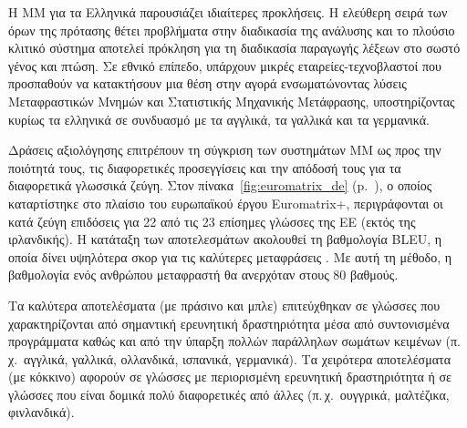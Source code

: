 \documentclass[]{../../metanetpaper}
\begin{document}
\begin{multicols}{2}

Η ΜΜ για τα Ελληνικά παρουσιάζει ιδιαίτερες προκλήσεις. Η ελεύθερη σειρά των όρων της πρότασης  θέτει προβλήματα στην διαδικασία της ανάλυσης και το πλούσιο κλιτικό σύστημα αποτελεί πρόκληση για τη διαδικασία παραγωγής λέξεων στο σωστό γένος και πτώση. Σε εθνικό επίπεδο, υπάρχουν μικρές εταιρείες-τεχνοβλαστοί που προσπαθούν να κατακτήσουν μια θέση στην αγορά ενσωματώνοντας λύσεις Μεταφραστικών Μνημών και Στατιστικής Μηχανικής Μετάφρασης, υποστηρίζοντας κυρίως τα ελληνικά σε συνδυασμό με τα αγγλικά, τα γαλλικά και τα γερμανικά.

Δράσεις αξιολόγησης επιτρέπουν τη σύγκριση των συστημάτων MΜ ως προς την ποιότητά τους, τις διαφορετικές προσεγγίσεις και την απόδοσή τους για τα διαφορετικά γλωσσικά ζεύγη. Στον πίνακα~\ref{fig:euromatrix_de} (p.~\pageref{fig:euromatrix_de}), ο οποίος καταρτίστηκε στο πλαίσιο του ευρωπαϊκού έργου Euromatrix+, περιγράφονται οι κατά ζεύγη επιδόσεις για 22 από τις 23 επίσημες γλώσσες της ΕΕ (εκτός της ιρλανδικής). Η κατάταξη των αποτελεσμάτων ακολουθεί τη βαθμολογία BLEU, η οποία δίνει υψηλότερα σκορ για τις καλύτερες μεταφράσεις \cite{bleu1}. Με αυτή τη μέθοδο, η βαθμολογία ενός ανθρώπου μεταφραστή θα ανερχόταν στους 80 βαθμούς.

Τα καλύτερα αποτελέσματα (με πράσινο και μπλε) επιτεύχθηκαν σε γλώσσες που χαρακτηρίζονται από σημαντική ερευνητική δραστηριότητα μέσα από συντονισμένα προγράμματα καθώς και από την ύπαρξη πολλών παράλληλων σωμάτων κειμένων (π.\,χ.~αγγλικά, γαλλικά, ολλανδικά, ισπανικά, γερμανικά). Τα χειρότερα αποτελέσματα (με κόκκινο) αφορούν σε γλώσσες με περιορισμένη ερευνητική δραστηριότητα ή σε γλώσσες που είναι δομικά πολύ διαφορετικές από άλλες (π.\,χ.~ουγγρικά, μαλτέζικα, φινλανδικά).


\end{multicols}
\end{document}
